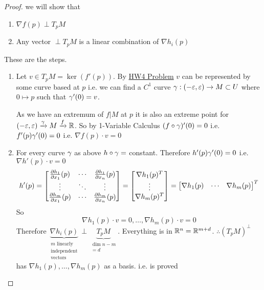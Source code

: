 \parinn
\begin{proof}
	we will show that \begin{enumerate}[label=\bfseries\tiny\protect\circled{\small\arabic*}]
		\item  $\nabla f(p)\perp T_pM$
		\item Any vector $\perp T_pM$ is a linear combination of $\nabla h_i(p)$
	\end{enumerate}
These are the steps. 
\begin{enumerate}[label=\bfseries\tiny\protect\circled{\small\arabic*}]
	\item Let $v\in T_pM=\ker (f'(p))$. By \href{https://drive.google.com/file/d/11OCy_upvhLy8mH0jCKwFbXqzEX3FBT8Z/view?usp=share_link}{HW4 Problem} $v$ can be represented by some curve based at $p$ i.e. we can find a $C^1$ curve $\gamma:(-\varepsilon,\varepsilon)\to M\subset U$ where $0\mapsto p$ such that $\gamma'(0)=v$. 
	
	As we have an extremum of $f|M$ at $p$ it is also an extreme point for $(-\varepsilon,\varepsilon)\xrightarrow{\gamma}M\xrightarrow{f}\mathbb{R}$. So by 1-Variable Calculus $(f\circ\gamma)'(0)=0$ i.e. $f'(p)\gamma'(0)=0$ i.e. $\nabla f(p)\cdot v=0$
	
	\item For every curve $\gamma$ as above $h\circ \gamma=$ constant. Therefore $h'(p)\gamma'(0)=0$ i.e. $\nabla h'(p)\cdot v=0$ $$h'(p)=\left[\begin{matrix} \frac{\partial h_1}{\partial x_1}(p)   & \cdots & \frac{\partial h_1}{\partial x_n}(p) \\ \vdots & \ddots & \vdots \\ \frac{\partial h_m}{\partial x_1}(p)   & \cdots & \frac{\partial h_m}{\partial x_n}(p)  \end{matrix}\right]=\left[\begin{matrix}\nabla h_1(p)^T \\ \vdots \\ \nabla h_m(p)^T\end{matrix}\right]=\left[\begin{matrix}\nabla h_1(p) & \cdots & \nabla h_m(p)\end{matrix}\right]^T$$ So $$\nabla h_1(p)\cdot v=0,\dots , \nabla h_m(p)\cdot v=0$$Therefore $\underset{\substack{ m\text{ linearly} \\ \text{independent} \\ \text{vectors}  }}{\underbrace{\nabla h_i(p)}}\perp \underset{\substack{ \dim n-m \\ =d }}{\underbrace{T_pM}}$. Everything is in $\mathbb{R}^n=\mathbb{R}^{m+d}$. $\therefore (T_pM)^{\perp}$ has $\nabla h_1(p),\dots, \nabla h_m(p)$ as a basis. i.e.  is proved
\end{enumerate}
\end{proof}
